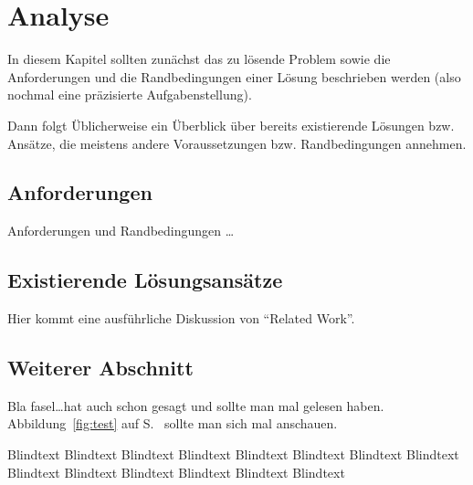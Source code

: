
\chapter{Analyse}
\label{ch:Analyse}
In diesem Kapitel sollten zun{\"a}chst das zu l{\"o}sende Problem
sowie die Anforderungen und die Randbedingungen 
einer L{\"o}sung beschrieben werden (also nochmal
eine pr{\"a}zisierte Aufgabenstellung).

Dann folgt {\"U}blicherweise ein {\"U}berblick {\"u}ber bereits existierende
L{\"o}sungen bzw. Ans{\"a}tze, die meistens andere Voraussetzungen bzw.
Randbedingungen annehmen.


\section{Anforderungen}
\label{ch:Analyse:sec:Anforderungen}
Anforderungen und Randbedingungen \ldots




\section{Existierende L{\"o}sungsans{\"a}tze}
\label{ch:Analyse:sec:RelatedWork}

Hier kommt eine ausf{\"u}hrliche Diskussion
von "`Related Work"'.




\section{Weiterer Abschnitt}
\label{ch:Analyse:sec:Abschnitt}

Bla fasel\ldots hat auch schon \cite{TB2000} gesagt und
\cite{TB98,JSAC96,qosr} sollte man mal gelesen haben.
Abbildung~\ref{fig:test} auf S.~\pageref{fig:test} sollte man
sich mal anschauen.



Blindtext Blindtext Blindtext Blindtext Blindtext Blindtext Blindtext
Blindtext Blindtext Blindtext Blindtext Blindtext Blindtext Blindtext

